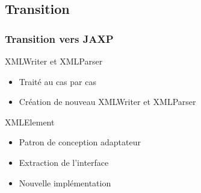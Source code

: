 \subsection{Transition}
\begin{frame}
\frametitle{Transition vers JAXP}
\begin{minipage}[c]{\linewidth}
	\begin{beamerboxesrounded}[shadow=true]{XMLWriter et XMLParser}
		\begin{itemize}
			\item Traité au cas par cas
			\item Création de nouveau XMLWriter et XMLParser
		\end{itemize}
	\end{beamerboxesrounded}
\end{minipage}
\vfill
\begin{minipage}[c]{\linewidth}
	\begin{beamerboxesrounded}[shadow=true]{XMLElement}
		\begin{itemize}
			\item Patron de conception adaptateur
			\item Extraction de l'interface
			\item Nouvelle implémentation
		\end{itemize}
	\end{beamerboxesrounded}
\end{minipage}
\vfill
\end{frame}
